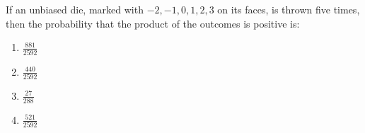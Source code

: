 \item If an unbiased die, marked with $-2, -1, 0, 1, 2, 3$ on its faces, is thrown five times, then the probability that the product of the outcomes is positive is: 
   \hfill{}
	\begin{enumerate}
        \item $\frac{881}{2592}$
        \item $\frac{440}{2592}$
        \item $\frac{27}{288}$
        \item $\frac{521}{2592}$
    \end{enumerate}
